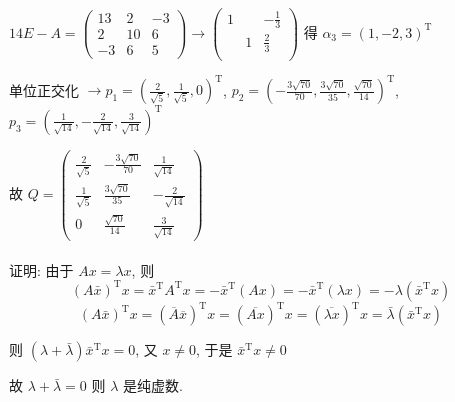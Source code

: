 		 \( 14E-A = \begin{pmatrix}
			 13 & 2  & -3 \\
			 2  & 10 & 6  \\
			 -3 & 6  & 5
		 \end{pmatrix} \rightarrow \begin{pmatrix}
			 1 &   & -\frac{1}{3} \\
			   & 1 & \frac{2}{3}  \\
			   &   &
		 \end{pmatrix} \) 得 \( \alpha_{3} = (1, -2, 3)^{\mathrm{T}} \)

		 单位正交化 \( \rightarrow p_{1} = \left( \frac{2}{\sqrt{5}}, \frac{1}{\sqrt{5}}, 0 \right)^{\mathrm{T}} \), \( p_{2} = \left( -\frac{3\sqrt{70}}{70}, \frac{3\sqrt{70}}{35}, \frac{\sqrt{70}}{14} \right)^{\mathrm{T}} \), \( p_{3} = \left( \frac{1}{\sqrt{14}}, -\frac{2}{\sqrt{14}}, \frac{3}{\sqrt{14}} \right)^{\mathrm{T}} \)

		 故 \( Q = \begin{pmatrix}
			 \frac{2}{\sqrt{5}} & -\frac{3\sqrt{70}}{70} & \frac{1}{\sqrt{14}}  \\
			 \frac{1}{\sqrt{5}} & \frac{3\sqrt{70}}{35}  & -\frac{2}{\sqrt{14}} \\
			 0                  & \frac{\sqrt{70}}{14}   & \frac{3}{\sqrt{14}}
		 \end{pmatrix} \)


	 \paragraph{} %
		 证明: 由于 \( Ax = \lambda x \), 则
		 \[ (A\bar{x})^{\mathrm{T}}x = \bar{x}^{\mathrm{T}}A^{\mathrm{T}}x = -\bar{x}^{\mathrm{T}}(Ax) = -\bar{x}^{\mathrm{T}}(\lambda x) = -\lambda(\bar{x}^{\mathrm{T}}x) \]
		 \[ (A\bar{x})^{\mathrm{T}}x = (\overline{A}\overline{x})^{\mathrm{T}}x = (\overline{Ax})^{\mathrm{T}}x = (\overline{\lambda x})^{\mathrm{T}}x = \bar{\lambda}(\bar{x}^{\mathrm{T}}x) \]

		 则 \( (\lambda+\bar{\lambda})\bar{x}^{\mathrm{T}}x = 0 \), 又 \( x \neq 0 \), 于是 \( \bar{x}^{\mathrm{T}}x \neq 0 \)

		 故 \( \lambda + \bar{\lambda} = 0 \) 则 \( \lambda \) 是纯虚数.
